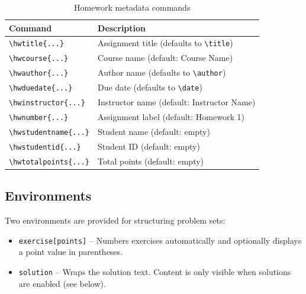 \begin{table}[htbp]
    \centering
    \caption{Homework metadata commands}
    \label{tab:homework-commands}
    \begin{tabular}{@{} l p{7.5cm} @{}}
        \toprule
        \textbf{Command} & \textbf{Description} \\
        \midrule
        \texttt{\textbackslash hwtitle\{...\}}       & Assignment title (defaults to \texttt{\textbackslash title}) \\
        \texttt{\textbackslash hwcourse\{...\}}      & Course name (default: Course Name) \\
        \texttt{\textbackslash hwauthor\{...\}}      & Author name (defaults to \texttt{\textbackslash author}) \\
        \texttt{\textbackslash hwduedate\{...\}}     & Due date (defaults to \texttt{\textbackslash date}) \\
        \texttt{\textbackslash hwinstructor\{...\}}  & Instructor name (default: Instructor Name) \\
        \texttt{\textbackslash hwnumber\{...\}}      & Assignment label (default: Homework 1) \\
        \texttt{\textbackslash hwstudentname\{...\}} & Student name (default: empty) \\
        \texttt{\textbackslash hwstudentid\{...\}}   & Student ID (default: empty) \\
        \texttt{\textbackslash hwtotalpoints\{...\}} & Total points (default: empty) \\
        \bottomrule
    \end{tabular}
\end{table}

\subsection{Environments}

Two environments are provided for structuring problem sets:

\begin{itemize}
    \item \texttt{exercise[points]} -- Numbers exercises automatically and
          optionally displays a point value in parentheses.
    \item \texttt{solution} -- Wraps the solution text.  Content is only
          visible when solutions are enabled (see below).
\end{itemize}

